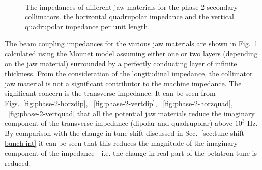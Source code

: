 \begin{figure}
\begin{center}
\\
\end{center}
\caption{The impedances of different jaw materials for the phase 2 secondary collimators.  the horizontal quadrupolar impedance and  the vertical quadrupolar impedance per unit length.}
\label{fig:phase-2-jaw-impedances}
\end{figure}

The beam coupling impedances for the various jaw materials are shown in Fig.~\ref{fig:phase-2-jaw-impedances} calculated using the Mounet model assuming either one or two layers (depending on the jaw material) surrounded by a perfectly conducting layer of infinite thickness. From the consideration of the longitudinal impedance, the collimator jaw material is not a significant contributor to the machine impedance. The significant concern is the transverse impedance. It can be seen from Figs.~\ref{fig:phase-2-horzdip}, ~\ref{fig:phase-2-vertdip}, ~\ref{fig:phase-2-horzquad}, ~\ref{fig:phase-2-vertquad} that all the potential jaw materials reduce the imaginary component of the transverse impedance (dipolar and quadrupolar) above $10^{3}$ Hz. By comparison with the change in tune shift discussed in Sec.~\ref{sec:tune-shift-bunch-int} it can be seen that this reduces the magnitude of the imaginary component of the impedance - i.e. the change in real part of the betatron tune is reduced. 

